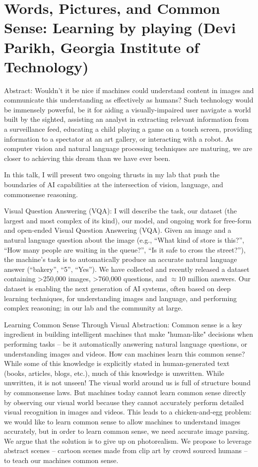 \section{Words, Pictures, and Common Sense: Learning by playing (Devi Parikh, Georgia Institute of Technology)}

Abstract: Wouldn't it be nice if machines could understand content in images and communicate this understanding as effectively as humans? Such technology would be immensely powerful, be it for aiding a visually-impaired user navigate a world built by the sighted, assisting an analyst in extracting relevant information from a surveillance feed, educating a child playing a game on a touch screen, providing information to a spectator at an art gallery, or interacting with a robot. As computer vision and natural language processing techniques are maturing, we are closer to achieving this dream than we have ever been.

In this talk, I will present two ongoing thrusts in my lab that push the boundaries of AI capabilities at the intersection of vision, language, and commonsense reasoning.

Visual Question Answering (VQA): I will describe the task, our dataset (the largest and most complex of its kind), our model, and ongoing work for free-form and open-ended Visual Question Answering (VQA). Given an image and a natural language question about the image (e.g., ``What kind of store is this?'', ``How many people are waiting in the queue?'', ``Is it safe to cross the street?''), the machine’s task is to automatically produce an accurate natural language answer (``bakery'', ``5'', ``Yes''). We have collected and recently released a dataset containing >250,000 images, >760,000 questions, and $\approx 10$ million answers. Our dataset is enabling the next generation of AI systems, often based on deep learning techniques, for understanding images and language, and performing complex reasoning; in our lab and the community at large.

Learning Common Sense Through Visual Abstraction: Common sense is a key ingredient in building intelligent machines that make "human-like" decisions when performing tasks -- be it automatically answering natural language questions, or understanding images and videos. How can machines learn this common sense? While some of this knowledge is explicitly stated in human-generated text (books, articles, blogs, etc.), much of this knowledge is unwritten. While unwritten, it is not unseen! The visual world around us is full of structure bound by commonsense laws. But machines today cannot learn common sense directly by observing our visual world because they cannot accurately perform detailed visual recognition in images and videos. This leads to a chicken-and-egg problem: we would like to learn common sense to allow machines to understand images accurately, but in order to learn common sense, we need accurate image parsing. We argue that the solution is to give up on photorealism. We propose to leverage abstract scenes -- cartoon scenes made from clip art by crowd sourced humans -- to teach our machines common sense.



